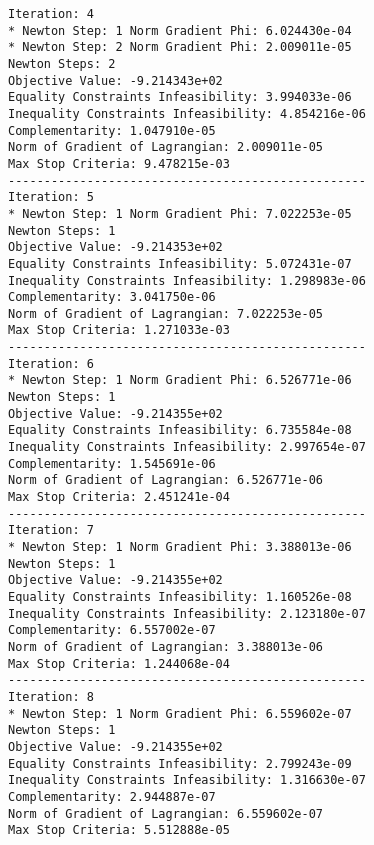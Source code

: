 \documentclass{article}
\begin{document}
\begin{minipage}[t]{0.45\textwidth}
\begin{verbatim}
Iteration: 4
* Newton Step: 1 Norm Gradient Phi: 6.024430e-04
* Newton Step: 2 Norm Gradient Phi: 2.009011e-05
Newton Steps: 2
Objective Value: -9.214343e+02
Equality Constraints Infeasibility: 3.994033e-06
Inequality Constraints Infeasibility: 4.854216e-06
Complementarity: 1.047910e-05
Norm of Gradient of Lagrangian: 2.009011e-05
Max Stop Criteria: 9.478215e-03
--------------------------------------------------
Iteration: 5
* Newton Step: 1 Norm Gradient Phi: 7.022253e-05
Newton Steps: 1
Objective Value: -9.214353e+02
Equality Constraints Infeasibility: 5.072431e-07
Inequality Constraints Infeasibility: 1.298983e-06
Complementarity: 3.041750e-06
Norm of Gradient of Lagrangian: 7.022253e-05
Max Stop Criteria: 1.271033e-03
--------------------------------------------------
Iteration: 6
* Newton Step: 1 Norm Gradient Phi: 6.526771e-06
Newton Steps: 1
Objective Value: -9.214355e+02
Equality Constraints Infeasibility: 6.735584e-08
Inequality Constraints Infeasibility: 2.997654e-07
Complementarity: 1.545691e-06
Norm of Gradient of Lagrangian: 6.526771e-06
Max Stop Criteria: 2.451241e-04
--------------------------------------------------
Iteration: 7
* Newton Step: 1 Norm Gradient Phi: 3.388013e-06
Newton Steps: 1
Objective Value: -9.214355e+02
Equality Constraints Infeasibility: 1.160526e-08
Inequality Constraints Infeasibility: 2.123180e-07
Complementarity: 6.557002e-07
Norm of Gradient of Lagrangian: 3.388013e-06
Max Stop Criteria: 1.244068e-04
--------------------------------------------------
Iteration: 8
* Newton Step: 1 Norm Gradient Phi: 6.559602e-07
Newton Steps: 1
Objective Value: -9.214355e+02
Equality Constraints Infeasibility: 2.799243e-09
Inequality Constraints Infeasibility: 1.316630e-07
Complementarity: 2.944887e-07
Norm of Gradient of Lagrangian: 6.559602e-07
Max Stop Criteria: 5.512888e-05
\end{verbatim}
\end{minipage}
\end{document}
